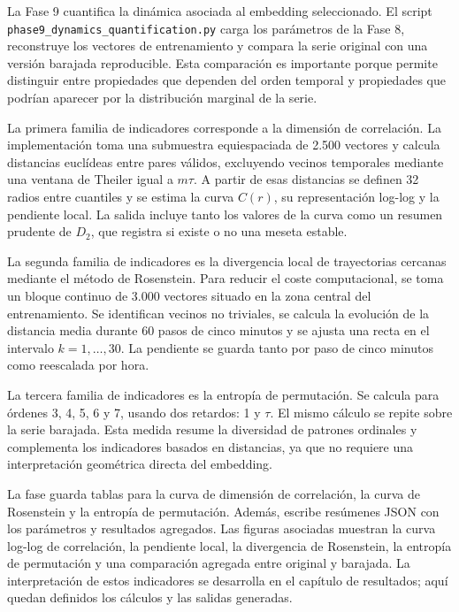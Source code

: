 La Fase 9 cuantifica la dinámica asociada al embedding seleccionado. El script \texttt{phase9\_\allowbreak dynamics\_\allowbreak quantification.py} carga los parámetros de la Fase 8, reconstruye los vectores de entrenamiento y compara la serie original con una versión barajada reproducible. Esta comparación es importante porque permite distinguir entre propiedades que dependen del orden temporal y propiedades que podrían aparecer por la distribución marginal de la serie.

La primera familia de indicadores corresponde a la dimensión de correlación. La implementación toma una submuestra equiespaciada de 2.500 vectores y calcula distancias euclídeas entre pares válidos, excluyendo vecinos temporales mediante una ventana de Theiler igual a \(m\tau\). A partir de esas distancias se definen 32 radios entre cuantiles y se estima la curva \(C(r)\), su representación log-log y la pendiente local. La salida incluye tanto los valores de la curva como un resumen prudente de \(D_2\), que registra si existe o no una meseta estable.

La segunda familia de indicadores es la divergencia local de trayectorias cercanas mediante el método de Rosenstein. Para reducir el coste computacional, se toma un bloque continuo de 3.000 vectores situado en la zona central del entrenamiento. Se identifican vecinos no triviales, se calcula la evolución de la distancia media durante 60 pasos de cinco minutos y se ajusta una recta en el intervalo \(k=1,\ldots,30\). La pendiente se guarda tanto por paso de cinco minutos como reescalada por hora.

La tercera familia de indicadores es la entropía de permutación. Se calcula para órdenes 3, 4, 5, 6 y 7, usando dos retardos: 1 y \(\tau\). El mismo cálculo se repite sobre la serie barajada. Esta medida resume la diversidad de patrones ordinales y complementa los indicadores basados en distancias, ya que no requiere una interpretación geométrica directa del embedding.

La fase guarda tablas para la curva de dimensión de correlación, la curva de Rosenstein y la entropía de permutación. Además, escribe resúmenes JSON con los parámetros y resultados agregados. Las figuras asociadas muestran la curva log-log de correlación, la pendiente local, la divergencia de Rosenstein, la entropía de permutación y una comparación agregada entre original y barajada. La interpretación de estos indicadores se desarrolla en el capítulo de resultados; aquí quedan definidos los cálculos y las salidas generadas.

